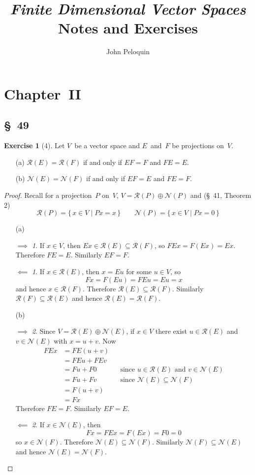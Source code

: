 \documentclass[letterpaper,12pt]{article}
\title{\textit{Finite Dimensional Vector Spaces}\\Notes and Exercises}
\author{John Peloquin}
\date{}
\renewcommand{\ker}{\mathcal{N}}
\newcommand{\range}{\mathcal{R}}
\newcommand{\dsum}{\oplus}
\theoremstyle{definition}
\newtheorem*{exer}{Exercise}
\theoremstyle{remark}
\theoremstyle{direction}
\newtheorem*{fwd}{\(\implies\)}
\newtheorem*{bwd}{\(\impliedby\)}
\begin{document}
\maketitle

\section*{Chapter~II}
\subsection*{\S\ 49}
\begin{exer}[4]
Let \(V\)~be a vector space and \(E\)~and~\(F\) be projections on~\(V\).
\begin{enumerate}[itemsep=0pt]
\item[(a)] \(\range(E)=\range(F)\) if and only if \(EF=F\) and \(FE=E\).
\item[(b)] \(\ker(E)=\ker(F)\) if and only if \(EF=E\) and \(FE=F\).
\end{enumerate}
\end{exer}
\begin{proof}
Recall for a projection~\(P\) on~\(V\), \(V=\range(P)\dsum\ker(P)\) and (\S\ 41, Theorem 2)
\[\range(P)=\{\,x\in V\mid Px=x\,\}\qquad\ker(P)=\{\,x\in V\mid Px=0\,\}\]
\begin{enumerate}[itemsep=0pt]
\item[(a)]
\begin{fwd}
If \(x\in V\), then \(Ex\in\range(E)\subseteq\range(F)\), so \(FEx=F(Ex)=Ex\). Therefore \(FE=E\). Similarly \(EF=F\).
\end{fwd}
\begin{bwd}
If \(x\in\range(E)\), then \(x=Eu\) for some \(u\in V\), so
\[Fx=F(Eu)=FEu=Eu=x\]
and hence \(x\in\range(F)\). Therefore \(\range(E)\subseteq\range(F)\). Similarly \(\range(F)\subseteq\range(E)\) and hence \(\range(E)=\range(F)\).
\end{bwd}
\item[(b)]
\begin{fwd}
Since \(V=\range(E)\dsum\ker(E)\), if \(x\in V\) there exist \(u\in\range(E)\) and \(v\in\ker(E)\) with \(x=u+v\). Now
\begin{align*}
FEx&=FE(u+v)&&\\
	&=FEu+FEv&&\\
	&=Fu+F0&&\text{since \(u\in\range(E)\) and \(v\in\ker(E)\)}\\
	&=Fu+Fv&&\text{since \(\ker(E)\subseteq\ker(F)\)}\\
	&=F(u+v)\\
	&=Fx
\end{align*}
Therefore \(FE=F\). Similarly \(EF=E\).
\end{fwd}
\begin{bwd}
If \(x\in\ker(E)\), then
\[Fx=FEx=F(Ex)=F0=0\]
so \(x\in\ker(F)\). Therefore \(\ker(E)\subseteq\ker(F)\). Similarly \(\ker(F)\subseteq\ker(E)\) and hence \(\ker(E)=\ker(F)\).\qedhere
\end{bwd}
\end{enumerate}
\end{proof}
\end{document}
